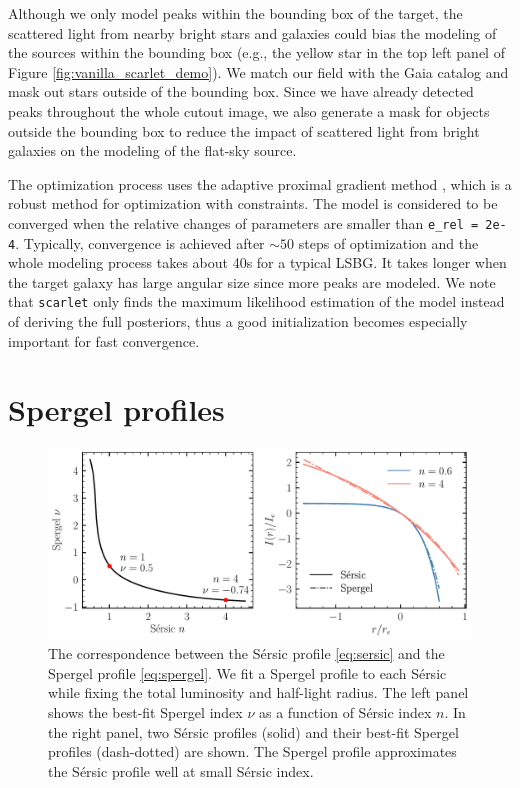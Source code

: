 \documentclass[twocolumn,astrosymb,twocolappendix]{aastex631}
\newcommand{\code}[1]{\texttt{#1}}
\newcommand{\sersic}{S\'ersic}
\begin{document}
\begin{CJK*}{UTF8}{gbsn}
Although we only model peaks within the bounding box of the target, the scattered light from nearby bright stars and galaxies could bias the modeling of the sources within the bounding box (e.g., the yellow star in the top left panel of Figure \ref{fig:vanilla_scarlet_demo}). We match our field with the Gaia catalog \citep{GAIA2016,GAIA2018} and mask out stars outside of the bounding box. Since we have already detected peaks throughout the whole cutout image, we also generate a mask for objects outside the bounding box to reduce the impact of scattered light from bright galaxies on the modeling of the flat-sky source. 

The optimization process uses the adaptive proximal gradient method \citep{Melchior2019}, which is a robust method for optimization with constraints. The model is considered to be converged when the relative changes of parameters are smaller than \code{e\_rel\,=\,2e-4}. Typically, convergence is achieved after $\sim 50$ steps of optimization and the whole modeling process takes about 40s for a typical LSBG. It takes longer when the target galaxy has large angular size since more peaks are modeled. We note that \code{scarlet} only finds the maximum likelihood estimation of the model instead of deriving the full posteriors, thus a good initialization becomes especially important for fast convergence. 


\section{Spergel profiles}\label{ap:spergel}
\begin{figure}[htbp!]
	\vbox{ 
		\centering
		\includegraphics[width=0.75\linewidth]{spergel_sersic_calib.pdf}
	}
    \caption{The correspondence between the \sersic{} profile \eqref{eq:sersic} and the Spergel profile \eqref{eq:spergel}. We fit a Spergel profile to each \sersic{} while fixing the total luminosity and half-light radius. The left panel shows the best-fit Spergel index $\nu$ as a function of \sersic{} index $n$. In the right panel, two \sersic{} profiles (solid) and their best-fit Spergel profiles (dash-dotted) are shown. The Spergel profile approximates the \sersic{} profile well at small \sersic{} index.  
    }
    \label{fig:spgl_calib}
\end{figure}


\end{CJK*}
\end{document}
